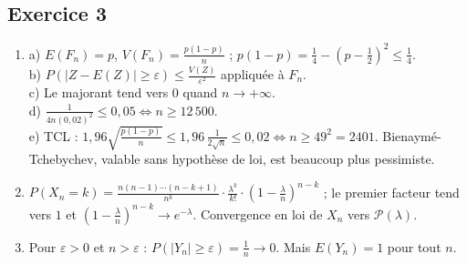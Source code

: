 \documentclass[11pt,a4paper]{article}
\begin{document}
\subsection*{Exercice 3}
\begin{enumerate}
  \item a) $E(F_n) = p$, $V(F_n) = \frac{p(1-p)}{n}$ ; $p(1-p) = \frac14 - (p - \frac12)^2 \leqslant \frac14$.\\
  b) $P(|Z - E(Z)| \geqslant \varepsilon) \leqslant \frac{V(Z)}{\varepsilon^2}$ appliquée à $F_n$.\\
  c) Le majorant tend vers $0$ quand $n \to +\infty$.\\
  d) $\frac{1}{4n(0{,}02)^2} \leqslant 0{,}05 \iff n \geqslant 12\,500$.\\
  e) TCL : $1{,}96\sqrt{\frac{p(1-p)}{n}} \leqslant 1{,}96\,\frac{1}{2\sqrt n} \leqslant 0{,}02 \iff n \geqslant 49^2 = 2401$.
  Bienaymé-Tchebychev, valable sans hypothèse de loi, est beaucoup plus pessimiste.
  \item $P(X_n = k) = \frac{n(n-1)\cdots(n-k+1)}{n^k}\cdot\frac{\lambda^k}{k!}\cdot\left(1 - \frac{\lambda}{n}\right)^{n-k}$ ;
  le premier facteur tend vers $1$ et $\left(1 - \frac\lambda n\right)^{n-k} \to e^{-\lambda}$.
  Convergence en loi de $X_n$ vers $\mathcal{P}(\lambda)$.
  \item Pour $\varepsilon > 0$ et $n > \varepsilon$ : $P(|Y_n| \geqslant \varepsilon) = \frac1n \to 0$. Mais $E(Y_n) = 1$ pour tout $n$.
\end{enumerate}
\end{document}
